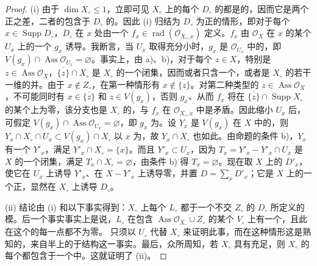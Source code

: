 \begin{proof}
(i) 由于 $\dim X_\circ\leq1$，立即可见 $X_\circ$ 上的每个 $D_\circ$ 的都是的，因而它是两个正之差，二者的包含于 $D_\circ$ 的。因此 (i) 归结为 $D_\circ$ 为正的情形，即对于每个 $x\in\operatorname{Supp}D_\circ$，$D_\circ$ 在 $x$ 处由一个 $f_x\in\operatorname{rad}(\mathcal O_{X_\circ,x})$ 定义。$f_x$ 由 $\mathcal O_X$ 在 $x$ 的某个 $U_x$ 上的一个 $g_x$ 诱导。我断言，当 $U_x$ 取得充分小时，$g_x$ 是 $\mathcal O_{U_x}$ 中的，即 $V(g_x)\cap\operatorname{Ass}\mathcal O_{U_x}=\varnothing$。事实上，由 a)、b)，对于每个 $z\in X$，特别是 $z\in\operatorname{Ass}\mathcal O_X$，$\overline{\{z\}}\cap X_\circ$ 是 $X_\circ$ 的一个闭集，因而或者只含一个，或者是 $X_\circ$ 的若干一维的并。由于 $x\notin Z_\circ$，在第一种情形有 $x\notin\overline{\{z\}}$。对第二种类型的 $z\in\operatorname{Ass}\mathcal O_X$，不可能同时有 $x\in\overline{\{z\}}$ 和 $z\in V(g_x)$，否则 $g_x$、从而 $f_x$ 将在 $\overline{\{z\}}\cap\operatorname{Supp}X_\circ$ 的某个上为零，该分支也是 $X_\circ$ 的，与 $f_x$ 在 $\mathcal O_{X_\circ,x}$ 中是矛盾。因此缩小 $U_x$ 后，可假定 $V(g_x)\cap\operatorname{Ass}\mathcal O_{U_x}=\varnothing$，即 $g_x$ 为。设 $Y_x$ 是 $V(g_x)$ 在 $X$ 中的，则 $Y_x\cap X_\circ\cap U_x\subset V(g_x)\cap X_\circ$ 以 $x$ 为，故 $Y_x\cap X_\circ$ 也如此。由命题的条件 b)，$Y_x$ 有一个 $Y'_x$，满足 $Y'_x\cap X_\circ=\{x\}$。而且 $Y'_x\subset U_x$，因为 $T_x=Y'_x-Y'_x\cap U_x$ 是 $X$ 的一个闭集，满足 $T_x\cap X_\circ=\varnothing$，由条件 b) 得 $T_x=\varnothing$。现在取 $X$ 上的 $D'_x$，使它在 $U_x$ 上诱导 $Y'_x$、在 $X-Y'_x$ 上诱导零，并置 $D=\sum_xD'_x$；它是 $X$ 上的一个正，显然在 $X_\circ$ 上诱导 $D_\circ$。

(ii) 结论由 (i) 和以下事实得到：$X_\circ$ 上每个 $L_\circ$ 都于一个不交 $Z_\circ$ 的 $D_\circ$ 所定义的模。后一个事实事实上是说，$L_\circ$ 在包含 $\operatorname{Ass}\mathcal O_{X_\circ}\cup Z_\circ$ 的某个 $V_\circ$ 上有一个，且此在这个的每一点都不为零。
只须以 $U_\circ$ 代替 $X_\circ$ 来证明此事，而在这种情形这是熟知的，来自半上的于结构这一事实。最后，众所周知，若 $X_\circ$ 具有充足，则 $X_\circ$ 的每个都包含于一个中。这就证明了 (ii)。
\end{proof}
